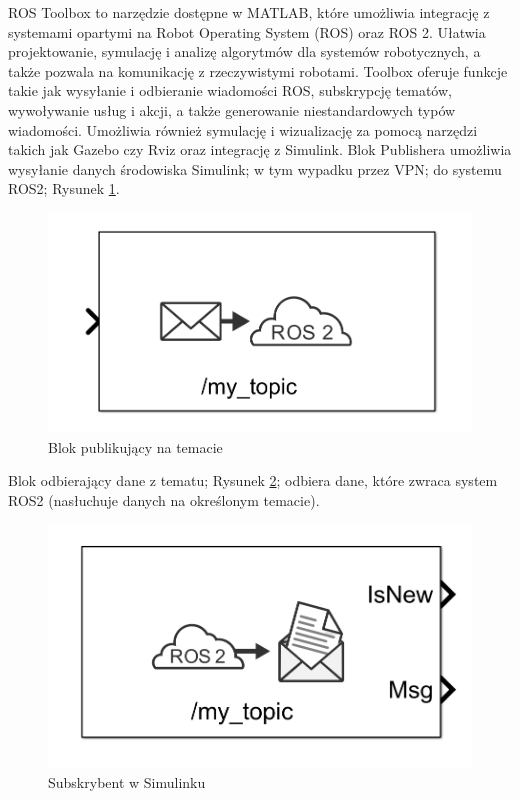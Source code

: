 \documentclass[journal,twoside,web]{ieeecolor}
\begin{document}
ROS Toolbox \href{https://www.mathworks.com/help/ros/}{\cite{ROS Toolbox}} to narzędzie dostępne w MATLAB, które umożliwia integrację z systemami opartymi na Robot Operating System (ROS) oraz ROS 2. Ułatwia projektowanie, symulację i analizę algorytmów dla systemów robotycznych, a także pozwala na komunikację z rzeczywistymi robotami. Toolbox oferuje funkcje takie jak wysyłanie i odbieranie wiadomości ROS, subskrypcję tematów, wywoływanie usług i akcji, a także generowanie niestandardowych typów wiadomości. Umożliwia również symulację i wizualizację za pomocą narzędzi takich jak Gazebo czy Rviz oraz integrację z Simulink. Blok Publishera umożliwia wysyłanie danych środowiska Simulink; w tym wypadku przez VPN; do systemu ROS2; Rysunek \ref{fig:pub}.
\begin{figure}[H]
	\centering
	\includegraphics[width=0.7\linewidth]{../figs/pub}
	\caption{Blok publikujący na temacie}
	\label{fig:pub}
\end{figure}
Blok odbierający dane z tematu; Rysunek \ref{fig:sub}; odbiera dane, które zwraca system ROS2 (nasłuchuje danych na określonym temacie).
\begin{figure}[H]
	\centering
	\includegraphics[width=1\linewidth]{../figs/sub}
	\caption{Subskrybent w Simulinku}
	\label{fig:sub}
\end{figure}
\end{document}
